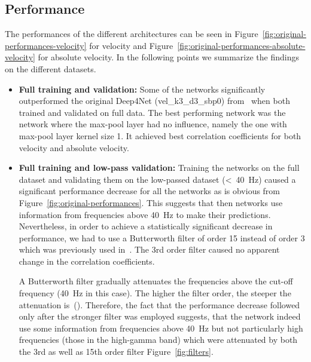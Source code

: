 \subsection{Performance}\label{subsec:performance}
The performances of the different architectures can be seen in Figure~\ref{fig:original-performances-velocity} for velocity and Figure~\ref{fig:original-performances-absolute-velocity} for absolute velocity.
In the following points we summarize the findings on the different datasets.

\begin{itemize}
    \item \textbf{Full training and validation:} Some of the networks significantly outperformed the original Deep4Net (vel\_k3\_d3\_sbp0) from~\cite{Hammer-2021} when both trained and validated on full data.
    The best performing network was the network where the max-pool layer had no influence, namely the one with max-pool layer kernel size 1. It achieved best correlation coefficients for both velocity and absolute velocity.
    
    \item \textbf{Full training and low-pass validation:} Training the networks on the full dataset and validating them on the low-passed dataset (<~40~Hz) caused a significant performance decrease for all the networks as is obvious from Figure~\ref{fig:original-performances}.
    This suggests that then networks use information from frequencies above 40~Hz to make their predictions.
    Nevertheless, in order to achieve a statistically significant decrease in performance, we had to use a Butterworth filter of order 15 instead of order 3 which was previously used in~\cite{Hammer-2021}. The 3rd order filter caused no apparent change in the correlation coefficients.
    
    A Butterworth filter gradually attenuates the frequencies above the cut-off frequency (40~Hz in this case).
    The higher the filter order, the steeper the attenuation is~(\cite{butterworth1930theory}).
    Therefore, the fact that the performance decrease followed only after the stronger filter was employed suggests, that the network indeed use some information from frequencies above 40~Hz but not particularly high frequencies (those in the high-gamma band) which were attenuated by both the 3rd as well as 15th order filter Figure~\ref{fig:filters}.
    

\end{itemize}
